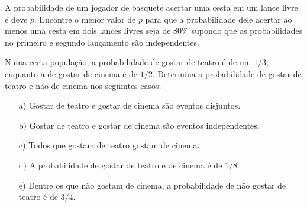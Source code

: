 \documentclass[11pt,addpoints,answers]{exam}
\begin{document}
\begin{questions}

  \question[30]
  A probabilidade de um jogador de basquete acertar uma cesta em um
  lance livre é deve $p$. Encontre o menor valor de $p$ para que
  a probabilidade dele acertar ao menos uma cesta em dois lances livres
  seja de $80\%$  supondo que as probabilidades no primeiro e segundo
  lançamento são independentes.

  \question[20]
  Numa certa população, a probabilidade de gostar de teatro é de um $1/3$,
  enquanto a de gostar de cinema é de $1/2$. Determina a probabilidade de
  gostar de teatro e não de cinema nos seguintes casos:
  \begin{itemize}
    \item[a)] Gostar de teatro e gostar de cinema são eventos disjuntos.
    \item[b)] Gostar de teatro e gostar de cinema são eventos independentes.
    \item[c)] Todos que gostam de teatro gostam de cinema.
    \item[d)] A probabilidade de gostar de teatro e de cinema é de $1/8$.
    \item[e)] Dentre os que não gostam de cinema, a probabilidade de
      não gostar de teatro é de $3/4$.
  \end{itemize}

\end{questions}



\begin{center}
\gradetable[h][questions]
\end{center}
\end{document}
